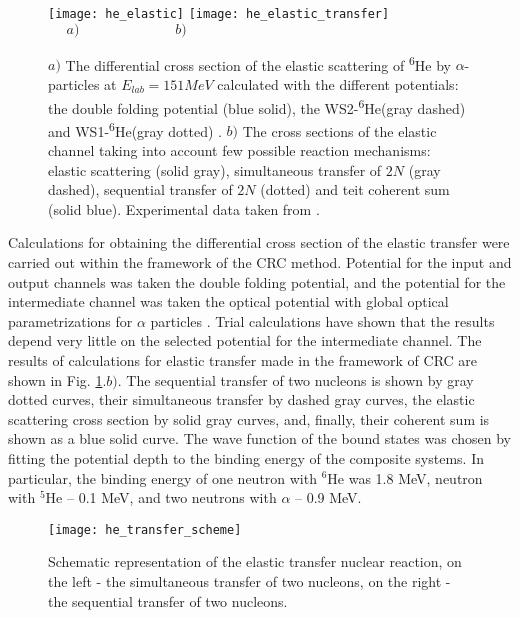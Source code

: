 \documentclass[
12pt, %
oneside, %
english, %
onehalfspacing, %
onehalfspacing, %
headsepline, %
]{MastersDoctoralThesis} %
\newcommand{\he}{\textsuperscript{6}He\xspace}
\begin{document}
\begin{figure}
\centering
\texttt{[image: he\_elastic]}
\texttt{[image: he\_elastic\_transfer]} \\
$~~~~~~a)~~~~~~~~~~~~~~~~~~~~~~~~~~~~~~~b)$
\decoRule
\caption{  \footnotesize  $a)$ The differential cross section of the elastic scattering of \he by $\alpha$-particles at $E_{lab}=151MeV$ calculated with the different potentials: the double folding potential (blue solid), the WS2-\he  (gray dashed) \cite{oganessian1999dynamics} and  WS1-\he (gray dotted) \cite{oganessian1999dynamics}. $b)$ The cross sections of the elastic channel taking into account few possible reaction mechanisms: elastic scattering (solid gray), simultaneous transfer of $2N$ (gray dashed), sequential transfer of $2N$ (dotted) and teit coherent sum (solid blue). Experimental data taken from \cite{oganessian1999dynamics}.
}
\label{he_elastic}
\end{figure}

Calculations for obtaining the differential cross section of the elastic transfer were carried out within the framework of the CRC method. Potential for the input and output channels was taken the double folding potential, and the potential for the intermediate channel was taken the optical potential with global optical parametrizations for $\alpha$ particles \cite{avrigeanu1994global}. Trial calculations have shown that the results depend very little on the selected potential for the intermediate channel.
The results of calculations for elastic transfer made in the framework of CRC are shown in Fig. \ref{he_elastic}.$b)$. 
The sequential transfer of two nucleons is shown by gray dotted curves, their simultaneous transfer by dashed gray curves, the elastic scattering cross section by solid gray curves, and, finally, their coherent sum is shown as a blue solid curve. 
The wave function of the bound states was chosen by fitting the potential depth to the binding energy of the composite systems. 
In particular, the binding energy of one neutron with $^6$He was 1.8 MeV,  neutron with $^5$He -- 0.1 MeV, and two neutrons with  $\alpha$  -- 0.9 MeV. 

\begin{figure}[bp]
\centering
\texttt{[image: he\_transfer\_scheme]}
\decoRule
\caption{  \footnotesize  Schematic representation of the elastic transfer nuclear reaction, on the left - the simultaneous transfer of two nucleons, on the right - the sequential transfer of two nucleons.
}
\label{he_transfer_scheme}
\end{figure}
\end{document}
